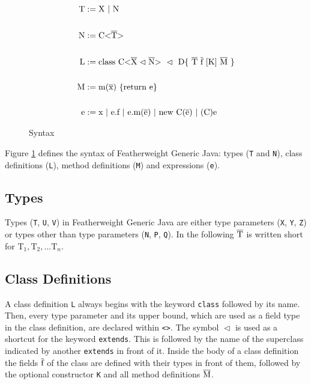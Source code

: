 \begin{figure}[tp]
    \begin{align*}
        \text{T} &:= \text{X} \ | \ \text{N}\\
        \\
        \text{N} &:= \text{C} \vv{\ot{T}}\\
        \\
        \text{L} &:= \text{class} \ \text{C} \xn \ \vartriangleleft \ \text{D} \{ \ \ot{T} \ \ot{f} \ [\text{K}] \ \ot{M} \ \}\\
        \\
        \text{M} &:= \text{m}(\ot{x}) \ \{\text{return e}\}\\
        \\
        \text{e} &:= \text{x} \ | \ \text{e.f} \ | \ \text{e.m(}\ot{e}\text{)} \ | \ \text{new C(}\ot{e}\text{)} \ | \ \text{(C)e}
    \end{align*}
    \caption{Syntax}
    \label{syntax}
\end{figure}

Figure \ref{syntax} defines the syntax of Featherweight Generic Java: types (\verb|T| and \verb|N|), class definitions (\verb|L|), method definitions (\verb|M|) and expressions (\verb|e|).

\subsection{Types}
Types (\verb|T|, \verb|U|, \verb|V|) in Featherweight Generic Java are either type parameters (\verb|X|, \verb|Y|, \verb|Z|) or types other than type parameters (\verb|N|, \verb|P|, \verb|Q|).
In the following $\overline{\text{T}}$ is written short for $\text{T}_1, \text{T}_2, ... \text{T}_n$.

\subsection{Class Definitions}

A class definition \verb|L| always begins with the keyword \verb|class| followed by its name. Then, every type parameter and its upper bound, which are used as a field type in the class definition, are declared within \verb|<>|. The symbol $\vartriangleleft$ is used as a shortcut for the keyword \verb|extends|.
This is followed by the name of the superclass indicated by another \verb|extends| in front of it. Inside the body of a class definition the fields $\overline{\text{f}}$ of the class are defined with their types in front of them, followed by the optional constructor \verb|K| and all method definitions $\overline{\text{M}}$.

